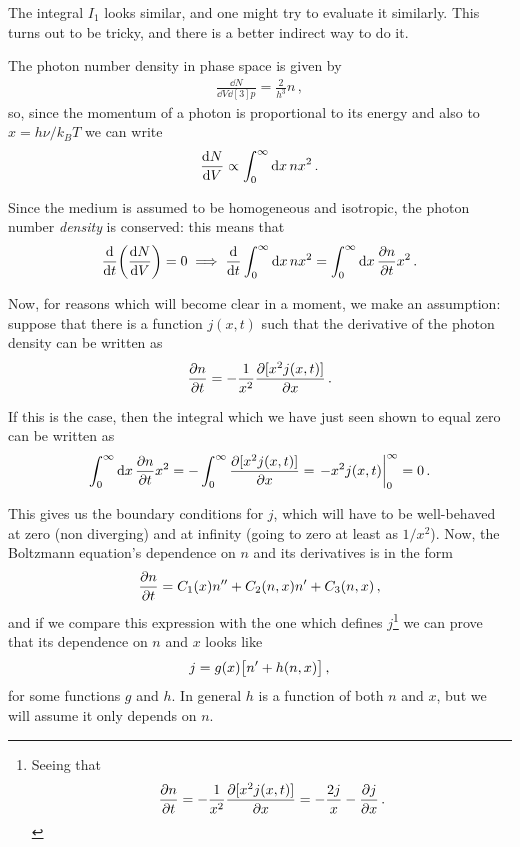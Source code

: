 \documentclass[main.tex]{subfiles}
\begin{document}
The integral \(I_1 \) looks similar, and one might try to evaluate it similarly. This turns out to be tricky, and there is a better indirect way to do it. 

The photon number density in phase space is given by 
%
\begin{align}
\frac{ \dd{N}}{ \dd{V} \dd[3]{p}} = \frac{2}{h^3} n
\,,
\end{align}
%
so, since the momentum of a photon is proportional to its energy and also to \(x = h \nu / k_B T\) we can write 
%
\begin{align}
\dv{N}{V} \propto \int_0^{\infty } \dd{x} n x^2
\,.
\end{align}


Since the medium is assumed to be homogeneous and isotropic, the photon number \emph{density} is conserved: this means that 
%
\begin{align}
\dv{}{t} \qty(\dv{N}{V}) = 0 
\implies
\dv{}{t} \int_0^{\infty } \dd{x} n x^2 = \int_0^{\infty } \dd{x} \pdv{n}{t} x^2
\,.
\end{align}

Now, for reasons which will become clear in a moment, we make an assumption: suppose that there is a function \(j(x, t )\) such that the derivative of the photon density can be written as 
%
\begin{align}
\pdv{n}{t} = - \frac{1}{x^2} \pdv{[x^2 j(x, t)]}{x}
\,.
\end{align}

If this is the case, then the integral which we have just seen shown to equal zero can be written as 
%
\begin{align}
\int_0^{\infty } \dd{x} \pdv{n}{t} x^2  = -\int_0^{\infty } \pdv{[x^2 j(x, t)]}{x}  = \eval{- x^2 j(x, t) }_{0}^{\infty } = 0
\,.
\end{align}

This gives us the boundary conditions for \(j\), which will have to be well-behaved at zero (non diverging) and at infinity (going to zero at least as \(1/x^2\)). 
Now, the Boltzmann equation's dependence on \(n\) and its derivatives is in the form 
%
\begin{align}
\pdv{n}{t} = C_1 (x ) n'' + C_2 (n, x) n' + C_3 (n, x)
\,,
\end{align}
%
and if we compare this expression with the one which defines \(j\)\footnote{Seeing that 
%
\begin{align}
\pdv{n}{t} = - \frac{1}{x^2} 
\pdv{[x^2 j(x, t)]}{x}
= - \frac{2j}{x} - \pdv{j}{x}
\,.
\end{align}
%
} we can prove that its dependence on \(n\) and \(x\) looks like 
%
\begin{align}
j = g(x) \qty[n' + h (n, x)]
\,,
\end{align}
%
for some functions \(g\) and \(h\). In general \(h\) is a function of both \(n\) and \(x\), but we will assume it only depends on \(n\). 
\end{document}
